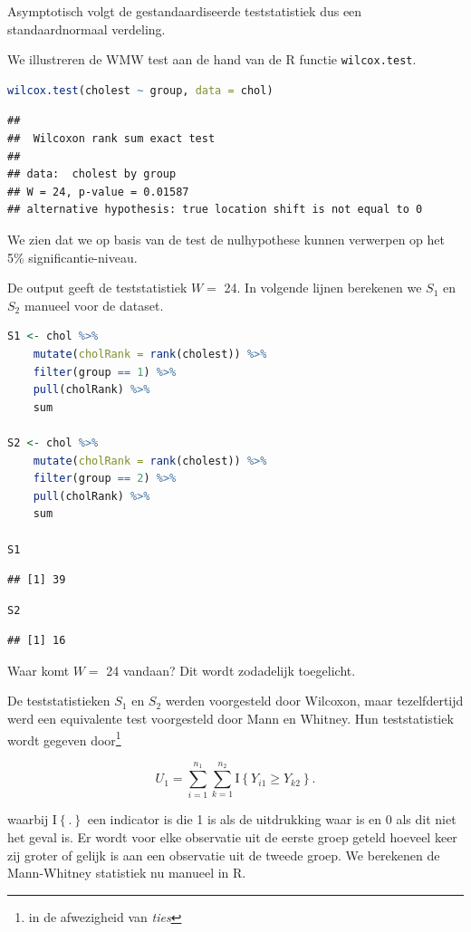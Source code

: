 \documentclass[
  12pt,dutch,coursenotes]{book}
\newcommand{\passthrough}[1]{#1}
\theoremstyle{definition}
\theoremstyle{definition}
\theoremstyle{definition}
\theoremstyle{definition}
\theoremstyle{remark}
\begin{document}
Asymptotisch volgt de gestandaardiseerde teststatistiek dus een standaardnormaal verdeling.

We illustreren de WMW test aan de hand van de R functie \passthrough{\lstinline!wilcox.test!}.

\begin{lstlisting}[language=R]
wilcox.test(cholest ~ group, data = chol)
\end{lstlisting}

\begin{lstlisting}
## 
##  Wilcoxon rank sum exact test
## 
## data:  cholest by group
## W = 24, p-value = 0.01587
## alternative hypothesis: true location shift is not equal to 0
\end{lstlisting}

We zien dat we op basis van de test de nulhypothese kunnen verwerpen op het 5\% significantie-niveau.

De output geeft de teststatistiek \(W=\) 24.
In volgende lijnen berekenen we \(S_1\) en \(S_2\) manueel voor de dataset.

\begin{lstlisting}[language=R]
S1 <- chol %>%
    mutate(cholRank = rank(cholest)) %>%
    filter(group == 1) %>%
    pull(cholRank) %>%
    sum

S2 <- chol %>%
    mutate(cholRank = rank(cholest)) %>%
    filter(group == 2) %>%
    pull(cholRank) %>%
    sum

S1
\end{lstlisting}

\begin{lstlisting}
## [1] 39
\end{lstlisting}

\begin{lstlisting}[language=R]
S2
\end{lstlisting}

\begin{lstlisting}
## [1] 16
\end{lstlisting}

Waar komt \(W=\) 24 vandaan? Dit wordt zodadelijk toegelicht.

De teststatistieken \(S_1\) en \(S_2\) werden voorgesteld door Wilcoxon, maar tezelfdertijd werd een equivalente test voorgesteld door Mann en Whitney. Hun teststatistiek wordt gegeven door\footnote{in de afwezigheid van \emph{ties}}

\[
 U_1 = \sum_{i=1}^{n_1}\sum_{k=1}^{n_2} \text{I}\left\{Y_{i1}\geq Y_{k2}\right\}.
\]

waarbij \(\text{I}\left\{.\right\}\) een indicator is die 1 is als de uitdrukking waar is en 0 als dit niet het geval is.
Er wordt voor elke observatie uit de eerste groep geteld hoeveel keer zij groter of gelijk is aan een observatie uit de tweede groep.
We berekenen de Mann-Whitney statistiek nu manueel in R.
\end{document}
